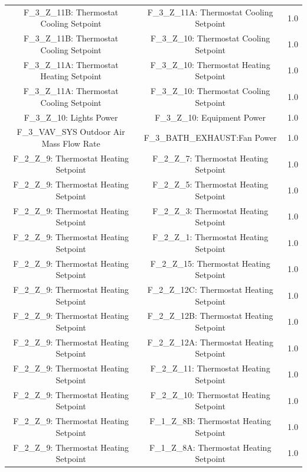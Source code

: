 \documentclass[aps, 10pt, a4paper]{article}
\begin{document}
\begin{longtable}{c|c||c}
                    F\_3\_Z\_11B: Thermostat Cooling Setpoint & F\_3\_Z\_11A: Thermostat Cooling Setpoint & 1.0 \\
                    F\_3\_Z\_11B: Thermostat Cooling Setpoint & F\_3\_Z\_10: Thermostat Cooling Setpoint & 1.0 \\
                    F\_3\_Z\_11A: Thermostat Heating Setpoint & F\_3\_Z\_10: Thermostat Heating Setpoint & 1.0 \\
                    F\_3\_Z\_11A: Thermostat Cooling Setpoint & F\_3\_Z\_10: Thermostat Cooling Setpoint & 1.0 \\
                    F\_3\_Z\_10: Lights Power & F\_3\_Z\_10: Equipment Power & 1.0 \\
                    F\_3\_VAV\_SYS Outdoor Air Mass Flow Rate & F\_3\_BATH\_EXHAUST:Fan Power & 1.0 \\
                    F\_2\_Z\_9: Thermostat Heating Setpoint & F\_2\_Z\_7: Thermostat Heating Setpoint & 1.0 \\
                    F\_2\_Z\_9: Thermostat Heating Setpoint & F\_2\_Z\_5: Thermostat Heating Setpoint & 1.0 \\
                    F\_2\_Z\_9: Thermostat Heating Setpoint & F\_2\_Z\_3: Thermostat Heating Setpoint & 1.0 \\
                    F\_2\_Z\_9: Thermostat Heating Setpoint & F\_2\_Z\_1: Thermostat Heating Setpoint & 1.0 \\
                    F\_2\_Z\_9: Thermostat Heating Setpoint & F\_2\_Z\_15: Thermostat Heating Setpoint & 1.0 \\
                    F\_2\_Z\_9: Thermostat Heating Setpoint & F\_2\_Z\_12C: Thermostat Heating Setpoint & 1.0 \\
                    F\_2\_Z\_9: Thermostat Heating Setpoint & F\_2\_Z\_12B: Thermostat Heating Setpoint & 1.0 \\
                    F\_2\_Z\_9: Thermostat Heating Setpoint & F\_2\_Z\_12A: Thermostat Heating Setpoint & 1.0 \\
                    F\_2\_Z\_9: Thermostat Heating Setpoint & F\_2\_Z\_11: Thermostat Heating Setpoint & 1.0 \\
                    F\_2\_Z\_9: Thermostat Heating Setpoint & F\_2\_Z\_10: Thermostat Heating Setpoint & 1.0 \\
                    F\_2\_Z\_9: Thermostat Heating Setpoint & F\_1\_Z\_8B: Thermostat Heating Setpoint & 1.0 \\
                    F\_2\_Z\_9: Thermostat Heating Setpoint & F\_1\_Z\_8A: Thermostat Heating Setpoint & 1.0 \\

\end{longtable}
\end{document}

